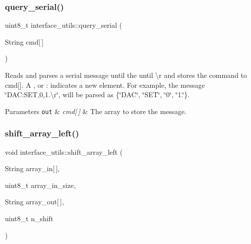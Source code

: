 \subsubsection{\texorpdfstring{query\+\_\+serial()}{query\_serial()}}
{\footnotesize\ttfamily uint8\+\_\+t interface\+\_\+utils\+::query\+\_\+serial (\begin{DoxyParamCaption}\item[{String}]{cmd\mbox{[}$\,$\mbox{]} }\end{DoxyParamCaption})\hspace{0.3cm}{\ttfamily [inline]}}

Reads and parses a serial message until the until \textquotesingle{}\textbackslash{}r\textquotesingle{} and stores the command to cmd\mbox{[}\mbox{]}. A \textquotesingle{},\textquotesingle{} or \textquotesingle{}\+:\textquotesingle{} indicates a new element. For example, the message \char`\"{}\+D\+A\+C\+:\+S\+E\+T,0,1.\textbackslash{}r\char`\"{}, will be parsed as \{\char`\"{}\+D\+A\+C\char`\"{}, \char`\"{}\+S\+E\+T\char`\"{}, \char`\"{}0\char`\"{}, \char`\"{}1.\char`\"{}\}. 
\begin{DoxyParams}[1]{Parameters}
\mbox{\tt out}  & {\em cmd\mbox{[}$\,$\mbox{]}} & The array to store the message. \\
\hline
\end{DoxyParams}
\mbox{\label{namespaceinterface__utils_ae7b158c5f5d6597c9e38164fb88fefd3}} 
\subsubsection{\texorpdfstring{shift\+\_\+array\+\_\+left()}{shift\_array\_left()}}
{\footnotesize\ttfamily void interface\+\_\+utils\+::shift\+\_\+array\+\_\+left (\begin{DoxyParamCaption}\item[{String}]{array\+\_\+in\mbox{[}$\,$\mbox{]},  }\item[{uint8\+\_\+t}]{array\+\_\+in\+\_\+size,  }\item[{String}]{array\+\_\+out\mbox{[}$\,$\mbox{]},  }\item[{uint8\+\_\+t}]{n\+\_\+shift }\end{DoxyParamCaption})\hspace{0.3cm}{\ttfamily [inline]}}

